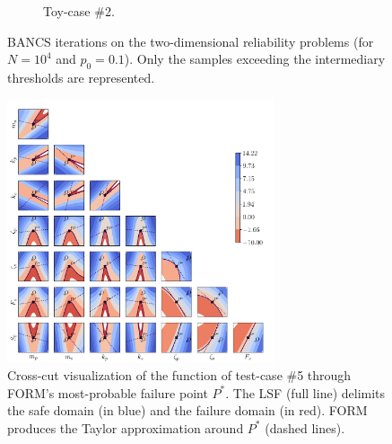 \begin{figure}
\begin{subfigure}[b]{0.49\linewidth}
        \caption{Toy-case \#2.}
    \end{subfigure}
    \caption{BANCS iterations on the two-dimensional reliability problems (for $N=10^4$ and $p_0=0.1$). 
    Only the samples exceeding the intermediary thresholds are represented.}
    \label{fig:2D_toycase_reliability}
\end{figure}


\begin{figure}
    \centering
    \includegraphics[width=0.7\textwidth]{part3/figures/BANCS/crosscut_oscillator.png}
    \caption{Cross-cut visualization of the function of test-case \#5 through FORM's most-probable failure point $P^*$. 
    The LSF (full line) delimits the safe domain (in blue) and the failure domain (in red). 
    FORM produces the Taylor approximation around $P^*$ (dashed lines).}
    \label{fig:crosscut_oscillator}
\end{figure}


